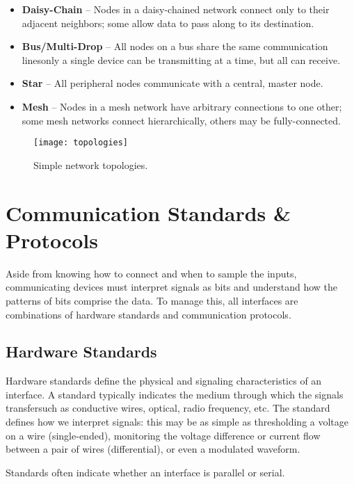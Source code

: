 \documentclass[openany,11pt,fleqn]{book} %
\begin{document}
\begin{itemize}
    \item \textbf{Daisy-Chain} -- Nodes in a daisy-chained network connect only to their adjacent neighbors; some allow data to pass along to its destination. 
    \item \textbf{Bus/Multi-Drop} -- All nodes on a bus share the same communication lines\textemdash only a single device can be transmitting at a time, but all can receive.
    \item \textbf{Star} -- All peripheral nodes communicate with a central, master node.
    \item \textbf{Mesh} -- Nodes in a mesh network have arbitrary connections to one other; some mesh networks connect hierarchically, others may be fully-connected.    
\end{itemize}



\begin{figure}[]
    \centering\texttt{[image: topologies]}
    \caption{Simple network topologies.}
    \label{topologies}
\end{figure}

\section{Communication Standards \& Protocols}

Aside from knowing how to connect and when to sample the inputs, communicating devices must interpret signals as bits and understand how the patterns of bits comprise the data. To manage this, all interfaces are combinations of hardware standards and communication protocols. 

\subsection{Hardware Standards}	
Hardware standards define the physical and signaling characteristics of an interface.
A standard typically indicates the medium through which the signals transfer\textemdash such as conductive wires, optical, radio frequency, etc. The standard defines how we interpret signals: this may be as simple as thresholding a voltage on a wire (single-ended), monitoring the voltage difference or current flow between a pair of wires (differential), or even a modulated waveform. 

Standards often indicate whether an interface is parallel or serial.
\end{document}
